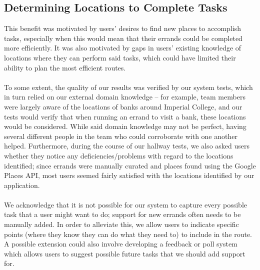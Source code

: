 \documentclass[a4paper, 10pt]{report}
\begin{document}
\subsection{Determining Locations to Complete Tasks}
This benefit was motivated by users' desires to find new places to accomplish tasks, especially when this would mean that their errands could be completed more efficiently. It was also motivated by gaps in users' existing knowledge of locations where they can perform said tasks, which could have limited their ability to plan the most efficient routes.\\\\ 
To some extent, the quality of our results was verified by our system tests, which in turn relied on our external domain knowledge -- for example, team members were largely aware of the locations of banks around Imperial College, and our tests would verify that when running an errand to visit a bank, these locations would be considered. While said domain knowledge may not be perfect, having several different people in the team who could corroborate with one another helped. Furthermore, during the course of our hallway tests, we also asked users whether they notice any deficiencies/problems with regard to the locations identified; since errands were manually curated and places found using the Google Places API, most users seemed fairly satisfied with the locations identified by our application. \\\\
We acknowledge that it is not possible for our system to capture every possible task that a user might want to do; support for new errands often needs to be manually added. In order to alleviate this, we allow users to indicate specific points (where they know they can do what they need to) to include in the route. A possible extension could also involve developing a feedback or poll system which allows users to suggest possible future tasks that we should add support for.
\end{document}
